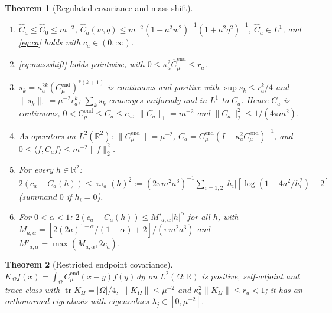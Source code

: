 \documentclass[11pt]{article}
\theoremstyle{plain}
\newtheorem{theorem}{Theorem}[section]
\theoremstyle{definition}
\theoremstyle{remark}
\newcommand{\R}{\mathbb{R}}
\newcommand{\Cend}{C^{\mathrm{end}}_{\mu}}
\newcommand{\hCend}{\hat C^{\mathrm{end}}_{\mu}}
\DeclareMathOperator{\trace}{tr}
\begin{document}
\begin{theorem}[Regulated covariance and mass shift]\label{thm:G-shift}
\begin{enumerate}[label=(\alph*)]
\item $\hat C_a\le\hat C_0\le m^{-2}$,
  $\hat C_a(w,q)\le m^{-2}(1+a^{2}w^{2})^{-1}(1+a^{2}q^{2})^{-1}$, $\hat C_a\in L^{1}$, and
  \eqref{eq:ca} holds with $c_a\in(0,\infty)$.
\item \eqref{eq:massshift} holds pointwise, with $0\le\kappa_a^{2}\hCend\le r_a$.
\item $s_k=\kappa_a^{2k}(\Cend)^{*(k+1)}$ is continuous and positive with
  $\sup s_k\le r_a^{k}/4$ and $\|s_k\|_1=\mu^{-2}r_a^{k}$; $\sum_ks_k$ converges uniformly
  and in $L^{1}$ to $C_a$. Hence $C_a$ is continuous, $0<\Cend\le C_a\le c_a$,
  $\|C_a\|_1=m^{-2}$ and $\|C_a\|_2^{2}\le1/(4\pi m^{2})$.
\item As operators on $L^{2}(\R^{2})$: $\|\Cend\|=\mu^{-2}$,
  $C_a=\Cend(I-\kappa_a^{2}\Cend)^{-1}$, and $0\le\langle f,C_af\rangle\le m^{-2}\|f\|_2^{2}$.
\item For every $h\in\R^{2}$: $2(c_a-C_a(h))\le\varpi_a(h)^{2}
  :=(2\pi m^{2}a^{3})^{-1}\sum_{i=1,2}|h_i|[\log(1+4a^{2}/h_i^{2})+2]$ (summand $0$ if $h_i=0$).
\item For $0<\alpha<1$: $2(c_a-C_a(h))\le M'_{a,\alpha}|h|^{\alpha}$ for all $h$, with
  $M_{a,\alpha}=[2(2a)^{1-\alpha}/(1-\alpha)+2]/(\pi m^{2}a^{3})$ and
  $M'_{a,\alpha}=\max(M_{a,\alpha},2c_a)$.
\end{enumerate}
\end{theorem}

\begin{theorem}[Restricted endpoint covariance]\label{thm:G-K}
$K_\Omega f(x)=\int_\Omega\Cend(x-y)f(y)\,dy$ on $L^{2}(\Omega;\R)$ is positive, self-adjoint
and trace class with $\trace K_\Omega=|\Omega|/4$, $\|K_\Omega\|\le\mu^{-2}$ and
$\kappa_a^{2}\|K_\Omega\|\le r_a<1$; it has an orthonormal eigenbasis with eigenvalues
$\lambda_j\in[0,\mu^{-2}]$.
\end{theorem}
\end{document}
